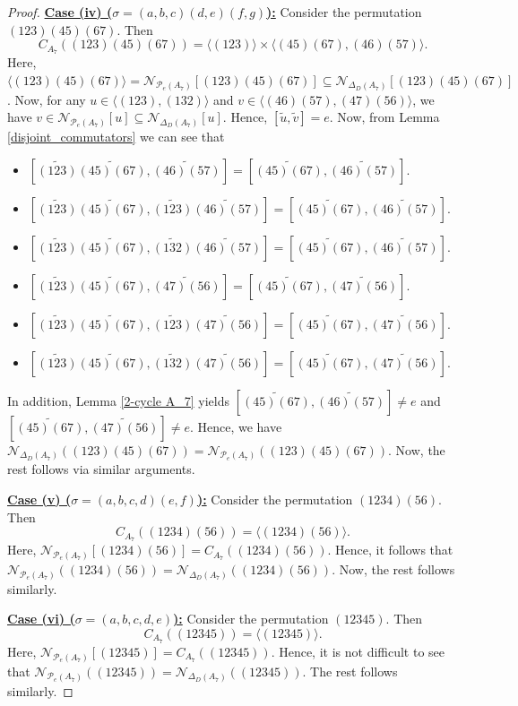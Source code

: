 \documentclass[12pt,a4paper]{article}
\begin{document}
\begin{proof}
\vspace{.3cm}
\noindent\underline{\bf{Case (iv) ($\sigma=(a,b,c)(d,e)(f,g)$):}} Consider the permutation $(123)(45)(67)$. Then \[C_{A_7}((123)(45)(67))=\langle(123)\rangle\times\langle(45)(67),(46)(57)\rangle.\] Here, $\langle(123)(45)(67)\rangle=\mathcal{N}_{\mathcal{P}_e(A_7)}[(123)(45)(67)]\subseteq\mathcal{N}_{\Delta_D(A_7)}[(123)(45)(67)]$. Now, for any $u\in \langle(123),(132)\rangle$ and $v\in \langle(46)(57),(47)(56)\rangle$, we have $v\in\mathcal{N}_{\mathcal{P}_e(A_7)}[u]\subseteq\mathcal{N}_{\Delta_D(A_7)}[u]$. Hence, $[\tilde{u},\tilde{v}]=e$. Now, from Lemma \ref{disjoint_commutators} we can see that 
\begin{itemize}
    \item $[\tilde{(123)}\tilde{(45)(67)},\tilde{(46)(57)}]=[\tilde{(45)(67)},\tilde{(46)(57)}].$
    \item $[\tilde{(123)}\tilde{(45)(67)},\tilde{(123)}\tilde{(46)(57)}]=[\tilde{(45)(67)},\tilde{(46)(57)}]$.
    \item $[\tilde{(123)}\tilde{(45)(67)},\tilde{(132)}\tilde{(46)(57)}]=[\tilde{(45)(67)},\tilde{(46)(57)}].$
    \item $[\tilde{(123)}\tilde{(45)(67)},\tilde{(47)(56)}]=[\tilde{(45)(67)},\tilde{(47)(56)}]$.
    \item $[\tilde{(123)}\tilde{(45)(67)},\tilde{(123)}\tilde{(47)(56)}]=[\tilde{(45)(67)},\tilde{(47)(56)}]$.
    \item $[\tilde{(123)}\tilde{(45)(67)},\tilde{(132)}\tilde{(47)(56)}]=[\tilde{(45)(67)},\tilde{(47)(56)}]$.
\end{itemize}
In addition, Lemma \ref{2-cycle A_7} yields $[\tilde{(45)(67)},\tilde{(46)(57)}]\neq e$ and $[\tilde{(45)(67)},\tilde{(47)(56)}]\neq e$. Hence, we have $\mathcal{N}_{\Delta_D(A_7)}((123)(45)(67))=\mathcal{N}_{\mathcal{P}_e(A_7)}((123)(45)(67))$. Now, the rest follows via similar arguments.

\vspace{.3cm}
\noindent\underline{\bf{Case (v) ($\sigma=(a,b,c,d)(e,f)$):}} Consider the permutation $(1234)(56)$. Then \[C_{A_7}((1234)(56))=\langle(1234)(56)\rangle.\] Here, $\mathcal{N}_{\mathcal{P}_e(A_7)}[(1234)(56)]=C_{A_7}((1234)(56))$. Hence, it follows that $\mathcal{N}_{\mathcal{P}_e(A_7)}((1234)(56))=\mathcal{N}_{\Delta_D(A_7)}((1234)(56))$. Now, the rest follows similarly.

\vspace{.3cm}
\noindent\underline{\bf{Case (vi) ($\sigma=(a,b,c,d,e)$):}} Consider the permutation $(12345)$. Then \[C_{A_7}((12345))=\langle(12345)\rangle.\] Here, $\mathcal{N}_{\mathcal{P}_e(A_7)}[(12345)]=C_{A_7}((12345))$. Hence, it is not difficult to see that $\mathcal{N}_{\mathcal{P}_e(A_7)}((12345))=\mathcal{N}_{\Delta_D(A_7)}((12345))$. The rest follows similarly.


\end{proof}
\end{document}
